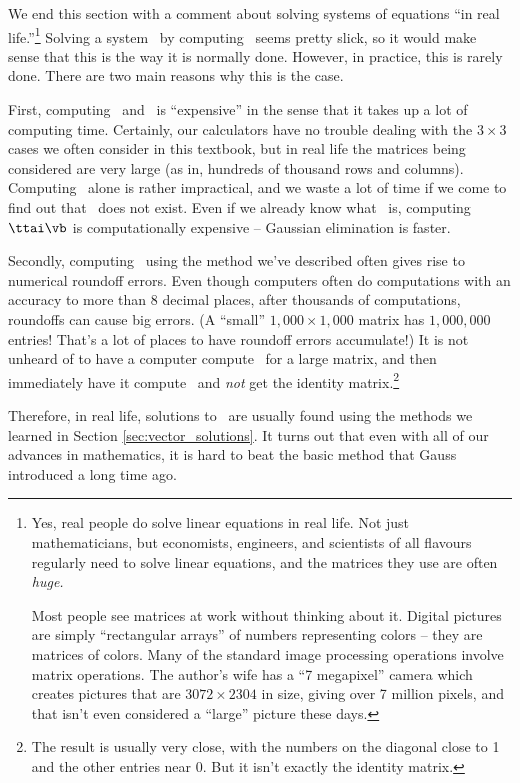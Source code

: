 \smallskip

We end this section with a comment about solving systems of equations ``in real life.''\footnote{Yes, real people do solve linear equations in real life. Not just mathematicians, but economists, engineers, and scientists of all flavours regularly need to solve linear equations, and the matrices they use are often \textit{huge.}

Most people see matrices at work without thinking about it. Digital pictures are simply ``rectangular arrays'' of numbers representing colors -- they are matrices of colors. Many of the standard image processing operations involve matrix operations. The author's wife has a ``7 megapixel'' camera which creates pictures that are $3072\times 2304$ in size, giving over 7 million pixels, and that isn't even considered a ``large'' picture these days.} Solving a system \ttaxb\ by computing \ttai\vb\ seems pretty slick, so it would make sense that this is the way it is normally done. However, in practice, this is rarely done. There are two main reasons why this is the case.

First, computing \ttai\ and \ttai\vb\ is ``expensive'' in the sense that it takes up a lot of computing time. Certainly, our calculators have no trouble dealing with the $3 \times 3$ cases we often consider in this textbook, but in real life the matrices being considered are very large (as in, hundreds of thousand rows and columns). Computing \ttai\ alone is rather impractical, and we waste a lot of time if we come to find out that \ttai\ does not exist. Even if we already know what \ttai\ is, computing $\ttai\vb$ is computationally expensive -- Gaussian elimination is faster.

Secondly, computing \ttai\ using the method we've described often gives rise to numerical roundoff errors. Even though computers often do computations with an accuracy to more than 8 decimal places, after thousands of computations, roundoffs can cause big errors. (A ``small'' $1,000 \times 1,000$ matrix has $1,000,000$ entries! That's a lot of places to have roundoff errors accumulate!) It is not unheard of to have a computer compute \ttai\ for a large matrix, and then immediately have it compute \tta\ttai\ and \textit{not} get the identity matrix.\footnote{The result is usually very close, with the numbers on the diagonal close to 1 and the other entries near 0. But it isn't exactly the identity matrix.}

Therefore, in real life, solutions to \ttaxb\ are usually found using the methods we learned in Section \ref{sec:vector_solutions}. It turns out that even with all of our advances in mathematics, it is hard to beat the basic method that Gauss introduced a long time ago.

